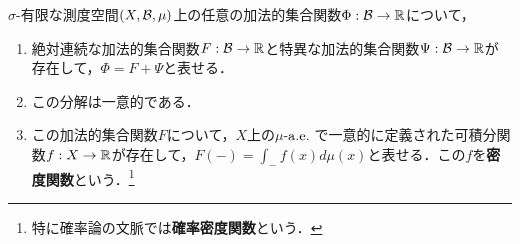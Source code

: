\documentclass[uplatex, dvipdfmx]{jsreport}
\begin{document}
\begin{theorem}\label{thm-Radon-Nykodym}
    $\sigma$-有限な測度空間$(X,\mathcal{B},\mu)$上の任意の加法的集合関数$\Phi:\mathcal{B}\to\mathbb{R}$について，
    \begin{enumerate}
        \item 絶対連続な加法的集合関数$F:\mathcal{B}\to\mathbb{R}$と特異な加法的集合関数$\Psi:\mathcal{B}\to\mathbb{R}$が存在して，$\Phi=F+\Psi$と表せる．
        \item この分解は一意的である．
        \item この加法的集合関数$F$について，$X$上の$\mu$-$\mathrm{a.e.}\;$で一意的に定義された可積分関数$f:X\to\mathbb{R}$が存在して，$F(-)=\int_{-}f(x)d\mu(x)$と表せる．この$f$を\textbf{密度関数}という．\footnote{特に確率論の文脈では\textbf{確率密度関数}という．}
    \end{enumerate}
\end{theorem}
\end{document}

